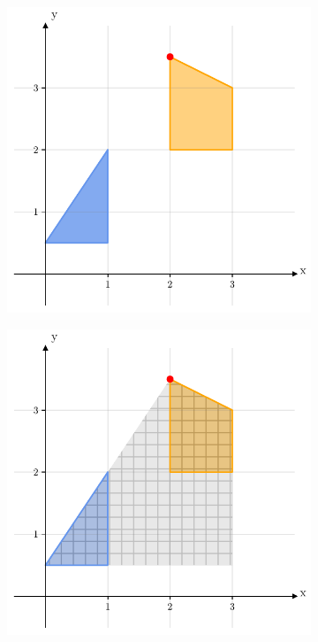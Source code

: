 \vspace*{0.5cm}
\begin{figure}[H]
    \centering
    \caption{DP reformulations}
    \label{fig:dp_solving_techniques}
    \begin{subfigure}{0.33\textwidth}
    \centering
        \includegraphics[width=0.95\linewidth]{Images/dp.pdf}
        \caption{}
    \end{subfigure}%
    \begin{subfigure}{0.33\textwidth}
    \centering
        \includegraphics[width=0.95\linewidth]{Images/dp_big_m.pdf}

\end{subfigure}
\end{figure}
